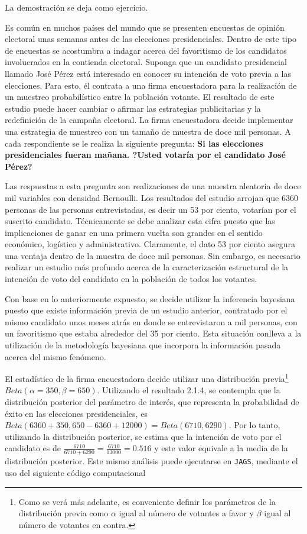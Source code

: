 \documentclass[10pt,openright]{book}\usepackage[]{graphicx}\usepackage[]{color}
\begin{document}
    La demostraci\'on se deja como ejercicio.
    
    \begin{Eje}
    Es com\'un en muchos pa\'ises del mundo que se presenten encuestas de opini\'on electoral unas semanas antes de las elecciones presidenciales. Dentro de este tipo de encuestas se acostumbra a indagar acerca del favoritismo de los candidatos involucrados en la contienda electoral. Suponga que un candidato presidencial llamado Jos\'e P\'erez est\'a interesado en conocer su intenci\'on de voto previa a las elecciones. Para esto, \'el contrata a una firma encuestadora para la realizaci\'on de un muestreo probabil\'istico entre la poblaci\'on votante. El resultado de este estudio puede hacer cambiar o afirmar las estrategias publicitarias y la redefinici\'on de la campa\~na electoral. La firma encuestadora decide implementar una estrategia de muestreo con un tama\~no de muestra de doce mil personas. A cada respondiente se le realiza la siguiente pregunta: \textbf{Si las elecciones presidenciales fueran ma\~nana. ?Usted votar\'ia por el candidato Jos\'e P\'erez?}
    
    Las respuestas a esta pregunta son realizaciones de una muestra aleatoria de doce mil variables con densidad Bernoulli. Los resultados del estudio arrojan que 6360 personas de las personas entrevistadas, es decir un 53 por ciento, votar\'ian por el suscrito candidato. T\'ecnicamente se debe analizar esta cifra puesto que las implicaciones de ganar en una primera vuelta son grandes en el sentido econ\'omico, log\'istico y administrativo. Claramente, el dato 53 por ciento asegura una ventaja dentro de la muestra de doce mil personas. Sin embargo, es necesario realizar un estudio m\'as profundo acerca de la caracterizaci\'on estructural de la intenci\'on de voto del candidato en la poblaci\'on de todos los votantes.
    
    Con base en lo anteriormente expuesto, se decide utilizar la inferencia bayesiana puesto que existe informaci\'on previa de un estudio anterior, contratado por el mismo candidato unos meses atr\'as en donde se entrevistaron a mil personas, con un favoritismo que estaba alrededor del 35 por ciento. Esta situaci\'on conlleva a la utilizaci\'on de la metodolog\'ia bayesiana que incorpora la informaci\'on pasada acerca del mismo fen\'omeno.
    
    El estad\'istico de la firma encuestadora decide utilizar una distribuci\'on previa\footnote{Como se ver\'a m\'as adelante, es conveniente definir los par\'ametros de la distribuci\'on previa como $\alpha$ igual al n\'umero de votantes a favor y $\beta$ igual al n\'umero de votantes en contra.} $Beta(\alpha=350, \beta=650)$. Utilizando el resultado 2.1.4, se contempla que la distribuci\'on posterior del par\'ametro de inter\'es, que representa la probabilidad de \'exito en las elecciones presidenciales, es $Beta(6360+350, 650-6360+12000)=Beta(6710, 6290)$. Por lo tanto, utilizando la distribuci\'on posterior, se estima que la intenci\'on de voto por el candidato es de $\frac{6710}{6710+6290}=\frac{6710}{13000}=0.516$ y este valor equivale a la media de la distribuci\'on posterior. Este mismo an\'alisis puede ejecutarse en \texttt{JAGS}, mediante el uso del siguiente c\'odigo computacional
    

\end{Eje}
\end{document}
